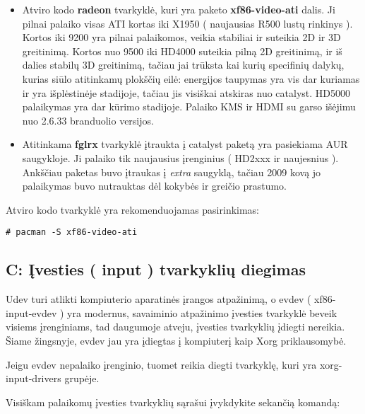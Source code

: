         \begin{itemize}
          \item Atviro kodo \textbf{radeon} tvarkyklė, kuri yra paketo
            \textbf{xf86-video-ati} dalis. Ji pilnai palaiko visas ATI
            kortas iki X1950 ( naujausias R500 lustų rinkinys
            ). Kortos iki 9200 yra pilnai palaikomos, veikia
            stabiliai ir suteikia 2D ir 3D greitinimą. Kortos nuo 9500
            iki HD4000 suteikia pilną 2D greitinimą, ir iš dalies
            stabilų 3D greitinimą, tačiau jai trūksta kai kurių
            specifinių dalykų, kurias siūlo atitinkamų plokščių eilė:
            energijos taupymas yra vis dar kuriamas ir yra
            išplėstinėje stadijoje, tačiau jis visiškai atskiras nuo
            catalyst. HD5000 palaikymas yra dar kūrimo
            stadijoje. Palaiko KMS ir HDMI su garso išėjimu nuo 2.6.33
            branduolio versijos.
          \item Atitinkama \textbf{fglrx} tvarkyklė įtraukta į
            catalyst paketą yra pasiekiama AUR saugykloje. Ji palaiko
            tik naujausius įrenginius ( HD2xxx ir naujesnius
            ). Ankščiau paketas buvo įtraukas į \textsl{extra}
            saugyklą, tačiau 2009 kovą jo palaikymas buvo nutrauktas
            dėl kokybės ir greičio prastumo.
        \end{itemize}

        Atviro kodo tvarkyklė yra rekomenduojamas
        pasirinkimas:

        \begin{verbatim}
# pacman -S xf86-video-ati
        \end{verbatim}
    
    \subsection{C: Įvesties ( input ) tvarkyklių diegimas}

      Udev turi atlikti kompiuterio aparatinės įrangos atpažinimą, o
      evdev ( xf86-input-evdev ) yra modernus, savaiminio atpažinimo
      įvesties tvarkyklė beveik visiems įrenginiams, tad daugumoje
      atveju, įvesties tvarkyklių įdiegti nereikia. Šiame žingsnyje,
      evdev jau yra įdiegtas į kompiuterį kaip Xorg priklausomybė.

      Jeigu evdev nepalaiko įrenginio, tuomet reikia diegti tvarkyklę,
      kuri yra xorg-input-drivers grupėje.

      Visiškam palaikomų įvesties tvarkyklių sąrašui įvykdykite
      sekančią komandą:

